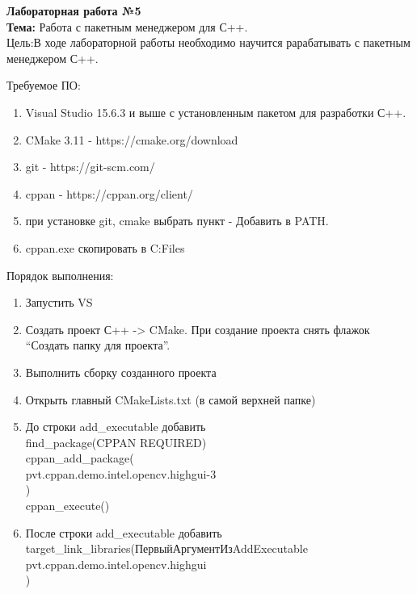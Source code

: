 
\begin{center}
\textbf{Лабораторная работа №5}
\\
\textbf{Тема:} Работа с пакетным менеджером для С++.
\\
Цель:В ходе лабораторной работы необходимо научится рарабатывать с пакетным менеджером С++.  
\end{center}

Требуемое ПО:
\begin{enumerate}

\item Visual Studio 15.6.3 и выше с установленным пакетом для разработки С++.\
\item CMake 3.11 - https://cmake.org/download
\item git - https://git-scm.com/
\item cppan - https://cppan.org/client/
\item при установке git, cmake выбрать пункт - Добавить в PATH.
\item cppan.exe скопировать в C:\Program Files\CMake\bin\\
\end{enumerate}

Порядок выполнения:
\\
\begin{enumerate}

\item Запустить VS
\item Создать проект С++ -> CMake. При создание проекта снять флажок “Создать папку для проекта”.
\item Выполнить сборку созданного проекта
\item Открыть главный CMakeLists.txt (в самой верхней папке)
\item До строки add\_executable добавить\\
find\_package(CPPAN REQUIRED)\\
cppan\_add\_package(\\
	pvt.cppan.demo.intel.opencv.highgui-3\\
)\\
cppan\_execute()\\

\item После строки add\_executable добавить\\
target\_link\_libraries(ПервыйАргументИзAddExecutable\\
	pvt.cppan.demo.intel.opencv.highgui\\
)\\

\end{enumerate}

